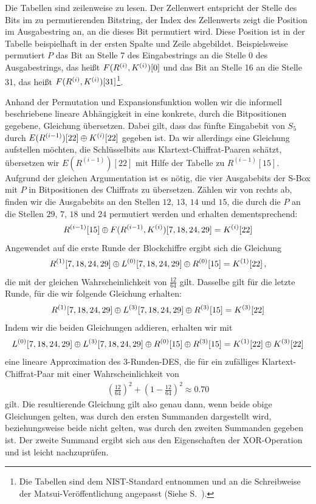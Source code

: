 Die Tabellen sind zeilenweise zu lesen. Der Zellenwert entspricht der
Stelle des Bits im zu permutierenden Bitstring, der Index des
Zellenwerts zeigt die Position im Ausgabestring an, an die dieses Bit
permutiert wird. Diese Position ist in der Tabelle beispielhaft in  der
ersten Spalte und Zeile abgebildet. Beispielsweise permutiert $P$ das
Bit an Stelle 7 des Eingabestrings an die Stelle 0 des Ausgabestrings,
das heißt $F(R^{(i)}, K^{(i)})[0]$ und das Bit an Stelle 16 an die
Stelle 31, das heißt $F(R^{(i)}, K^{(i)})[31]$\footnote{Die Tabellen
  sind dem NIST-Standard \cite{NIST_DES99} entnommen und an die
  Schreibweise der Matsui-Veröffentlichung angepasst (Siehe
  S.~\pageref{matsui-notation}).}. 

Anhand der Permutation und Expansionsfunktion wollen wir die informell
beschriebene lineare Abhängigkeit in eine konkrete, durch die
Bitpositionen gegebene, Gleichung übersetzen. Dabei gilt, dass das
fünfte Eingabebit von $S_5$ durch $E(R^{(i-1)})[22] \oplus
K^{(i)}[22]$ gegeben ist. Da wir allerdings eine Gleichung aufstellen
möchten, die Schlüsselbits aus Klartext-Chiffrat-Paaren schätzt,
übersetzen wir $E(R^{(i-1)})[22]$ mit Hilfe der Tabelle zu
$R^{(i-1)}[15]$. Aufgrund der gleichen Argumentation ist es nötig, die
vier Ausgabebits der S-Box mit $P$ in Bitpositionen des Chiffrats zu
übersetzen. Zählen wir von rechts ab, finden wir die Ausgabebits an den
Stellen $12$, $13$, $14$ und $15$, die durch die $P$ an die Stellen
$29$, $7$, $18$ und $24$ permutiert werden und erhalten dementsprechend: 
\begin{equation}
  R^{(i-1)}[15] \oplus F(R^{(i-1)},K^{(i)})[7,18,24,29] = K^{(i)}[22]
  \label{s5relation}
\end{equation}
Angewendet auf die erste Runde der Blockchiffre ergibt sich die Gleichung
\begin{equation*}
  R^{(1)}[7,18,24,29] \oplus L^{(0)}[7,18,24,29] \oplus R^{(0)}[15] = K^{(1)}[22]\, ,
\end{equation*}
die mit der gleichen Wahrscheinlichkeit von $\frac{12}{64}$
gilt. Dasselbe gilt für die letzte Runde, für die wir folgende Gleichung
erhalten: 
\begin{equation*}
  R^{(1)}[7,18,24,29] \oplus L^{(3)}[7,18,24,29] \oplus R^{(3)}[15] = K^{(3)}[22]
\end{equation*}
Indem wir die beiden Gleichungen addieren, erhalten wir mit
\begin{equation}
  L^{(0)}[7,18,24,29] \oplus L^{(3)}[7,18,24,29] \oplus R^{(0)}[15] \oplus R^{(3)}[15] = K^{(1)}[22] \oplus K^{(3)}[22]
  \label{3roundsapprox}
\end{equation}
eine lineare Approximation des $3$-Runden-DES, die für ein zufälliges
Klartext-Chiffrat-Paar mit einer Wahrscheinlichkeit von 
\begin{align*}
	\left(\frac{12}{64}\right)^{2}+\left(1-\frac{12}{64}\right)^{2} \approx 0.70
\end{align*}
gilt. Die resultierende Gleichung gilt also genau dann, wenn beide obige
Gleichungen gelten, was durch den ersten Summanden dargestellt wird,
beziehungsweise beide nicht gelten, was durch den zweiten Summanden
gegeben ist. Der zweite Summand ergibt sich aus den Eigenschaften der
XOR-Operation und ist leicht nachzuprüfen.


